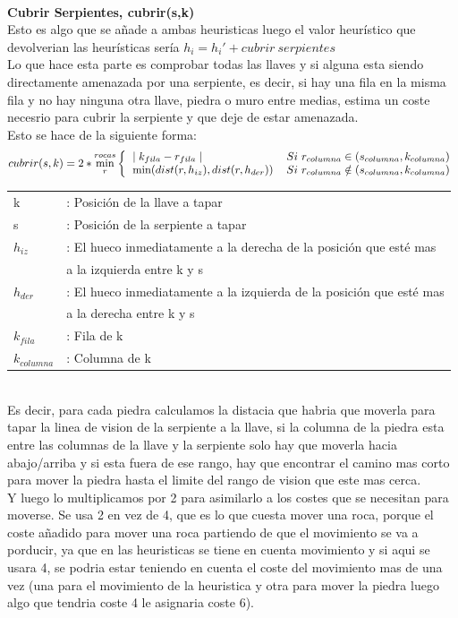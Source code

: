 \documentclass[11pt,spanish]{article}
\begin{document}
			\\
			\textbf{Cubrir Serpientes, cubrir(s,k)}\\
			Esto es algo que se añade a ambas heuristicas luego el valor heurístico que devolverian las heurísticas sería $h_i = h_i'+cubrir\ serpientes$\\
			Lo que hace esta parte es comprobar todas las llaves y si alguna esta siendo directamente amenazada por una serpiente, es decir, si hay una fila en la misma fila y no hay ninguna otra llave, piedra o muro entre medias, estima un coste necesrio para cubrir la serpiente y que deje de estar amenazada.\\
			Esto se hace de la siguiente forma:
			\[
				cubrir(s,k) = 2*\min\limits_r^{rocas}
				\bigg \{
				\begin{tabular}{ll}
					$\mid k_{fila}-r_{fila} \mid $& $Si\ r_{columna} \in (s_{columna}, k_{columna})$\\
					$\min(dist(r,h_{iz}),dist(r,h_{der}))$&$ Si\ r_{columna} \notin (s_{columna}, k_{columna})$\\
				\end{tabular}
			\]
			\begin{tabular}{ll}
				k&: Posición de la llave a tapar\\
				s&: Posición de la serpiente a tapar\\
				$h_{iz}$&: El hueco inmediatamente a la derecha de la posición que esté mas \\
				&  a la izquierda entre k y s\\
				$h_{der}$&: El hueco inmediatamente a la izquierda de la posición que esté mas \\
				&  a la derecha entre k y s\\
				$k_{fila}$&: Fila de k\\
				$k_{columna}$&: Columna de k
			\end{tabular}\\
			Es decir, para cada piedra calculamos la distacia que habria que moverla para tapar la linea de vision de la serpiente a la llave, si la columna de la piedra esta entre las columnas de la llave y la serpiente solo hay que moverla hacia abajo/arriba y si esta fuera de ese rango, hay que encontrar el camino mas corto para mover la piedra hasta el limite del rango de vision que este mas cerca.\\
			Y luego lo multiplicamos por 2 para asimilarlo a los costes que se necesitan para moverse. Se usa 2 en vez de 4, que es lo que cuesta mover una roca, porque el coste añadido para mover una roca partiendo de que el movimiento se va a porducir, ya que en las heuristicas se tiene en cuenta movimiento y si aqui se usara 4, se podria estar teniendo en cuenta el coste del movimiento mas de una vez (una para el movimiento de la heuristica y otra para mover la piedra luego algo que tendria coste 4 le asignaria coste 6).\\
\end{document}
